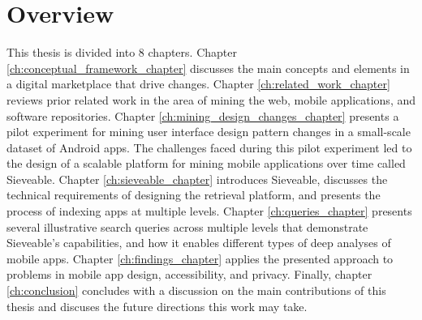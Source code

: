 \section{Overview}
This thesis is divided into 8 chapters.
Chapter \ref{ch:conceptual_framework_chapter} discusses the main concepts and elements in a digital marketplace that drive changes.
Chapter \ref{ch:related_work_chapter} reviews prior related work in the area of mining the web, mobile applications, and software repositories.
Chapter \ref{ch:mining_design_changes_chapter} presents a pilot experiment for mining user interface design pattern changes in a small-scale dataset of Android apps.
The challenges faced during this pilot experiment led to the design of a scalable platform for mining mobile applications over time called Sieveable.
Chapter \ref{ch:sieveable_chapter} introduces Sieveable, discusses the technical requirements of designing the retrieval platform, and presents the process of indexing apps at multiple levels.
Chapter \ref{ch:queries_chapter} presents several illustrative search queries across multiple levels that demonstrate Sieveable's capabilities, and how it enables different types of deep analyses of mobile apps.
Chapter \ref{ch:findings_chapter} applies the presented approach to problems in mobile app design, accessibility, and privacy.
Finally, chapter \ref{ch:conclusion} concludes with a discussion on the main contributions of this thesis and discuses the future directions this work may take.
